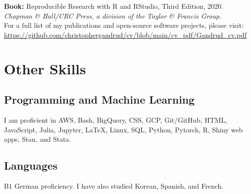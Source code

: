 \documentclass[a4paper]{article}
\begin{document}
\textbf{Book:} Reproducible Research with R and RStudio, Third Edition, 2020. {\emph{Chapman \& Hall/CRC Press, a division of the Taylor \& Francis Group}}. \\

\noindent For a full list of my publications and open-source software projects, please visit: \url{https://github.com/christophergandrud/cv/blob/main/cv_pdf/Gandrud_cv.pdf}

\section*{Other Skills}

\subsection*{Programming and Machine Learning}

I am proficient in AWS, Bash, BigQuery, CSS, GCP, Git/GitHub, HTML, JavaScript, Julia, Jupyter, LaTeX, Linux, SQL, Python, Pytorch, R, Shiny web apps, Stan, and Stata.

\subsection*{Languages}

B1 German proficiency. I have also studied Korean, Spanish, and French. 
\end{document}
